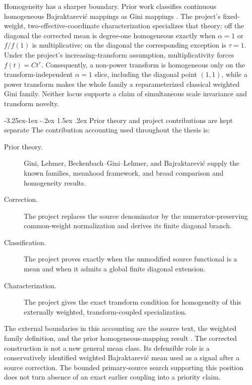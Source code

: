 \documentclass[12pt,a4paper,oneside]{report}
\makeatletter
\renewcommand\subsection{\@startsection{subsection}{2}{\z@}%
  {-3.25ex\@plus -1ex \@minus -.2ex}%
  {1.5ex \@plus .2ex}%
  {\normalfont\fontsize{12}{15}\selectfont\bfseries}}
\makeatother
\begin{document}
Homogeneity has a sharper boundary. Prior work classifies continuous
homogeneous Bajraktarevi\'c mappings as Gini mappings
\citep{aczeldaroczy1963,palespasteczka2016}. The project's fixed-weight,
two-effective-coordinate characterization specializes that theory: off the
diagonal the corrected mean is degree-one homogeneous exactly when
$\alpha=1$ or $f/f(1)$ is multiplicative; on the diagonal the corresponding
exception is $\tau=1$. Under the project's increasing-transform assumption,
multiplicativity forces $f(t)=Ct^r$. Consequently, a non-power transform is
homogeneous only on the transform-independent $\alpha=1$ slice, including the
diagonal point $(1,1)$, while a power transform makes the whole family a
reparameterized classical weighted Gini family. Neither locus supports a
claim of simultaneous scale invariance and transform novelty.

\subsection{Prior theory and project contributions are kept separate}
\label{sec:lit-mean-contribution-boundary}
The contribution accounting used throughout the thesis is:

\begin{description}
  \item[Prior theory.] Gini, Lehmer, Beckenbach--Gini--Lehmer, and
  Bajraktarevi\'c supply the known families, meanhood framework, and broad
  comparison and homogeneity results.
  \item[Correction.] The project replaces the source denominator by the
  numerator-preserving common-weight normalization and derives its finite
  diagonal branch.
  \item[Classification.] The project proves exactly when the unmodified source
  functional is a mean and when it admits a global finite diagonal extension.
  \item[Characterization.] The project gives the exact transform condition for
  homogeneity of this externally weighted, transform-coupled specialization.
\end{description}

The external boundaries in this accounting are the source text, the weighted
family definition, and the prior homogeneous-mapping result
\citep{calvet2023smartdca,paleszakaria2020,aczeldaroczy1963}.
The corrected construction is not a new general mean class. Its defensible
role is a conservatively identified weighted Bajraktarevi\'c mean used as a
signal after a source correction. The bounded primary-source search supporting
this position does not turn absence of an exact earlier coupling into a
priority claim.
\end{document}
